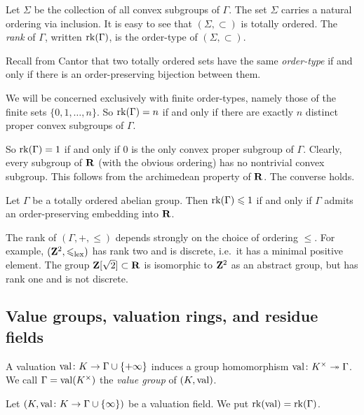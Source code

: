 Let $\Sigma$ be the collection of all convex subgroups of $\Gamma$. The set 
$\Sigma$ carries a natural ordering via inclusion. It is easy to see that 
$(\Sigma,\subset)$ is totally ordered. The \emph{rank} of $\Gamma$, written 
$\operatorname{rk}(\Gamma)$, is the order-type of $(\Sigma,\subset)$. 

Recall from Cantor that two totally ordered sets have the same 
\emph{order-type} if and only if there is an order-preserving bijection between 
them. 

We will be concerned exclusively with finite order-types, namely those of 
the finite sets $\{0,1,\dots,n\}$. So $\operatorname{rk}(\Gamma)=n$ if and only if there 
are exactly $n$ distinct proper convex subgroups of $\Gamma$. 

So $\operatorname{rk}(\Gamma)=1$ if and only if $0$ is the only convex proper subgroup of 
$\Gamma$. Clearly, every subgroup of $\mathbf{R}$ (with the obvious ordering) has no 
nontrivial convex subgroup. This follows from the archimedean property of 
$\mathbf{R}$. The converse holds. 

\begin{theorem}
Let $\Gamma$ be a totally ordered abelian group. Then
$\operatorname{rk}(\Gamma)\leqslant 1$ if and only if $\Gamma$ admits an order-preserving 
embedding into $\mathbf{R}$. 
\end{theorem}

The rank of $(\Gamma,+,\leqslant)$ depends strongly on the choice of ordering 
$\leqslant$. For example, $(\mathbf{Z}^2,\leqslant_\mathrm{lex})$ has rank two and is 
discrete, i.e.~it has a minimal positive element. The group 
$\mathbf{Z}[\sqrt{2}]\subset \mathbf{R}$ is isomorphic to $\mathbf{Z}^2$ as an abstract group, but 
has rank one and is not discrete. 





\subsection{Value groups, valuation rings, and residue fields}

A valuation $\operatorname{val}\colon K\to \Gamma\cup\{+\infty\}$ induces a group 
homomorphism $\operatorname{val}\colon K^\times \twoheadrightarrow \Gamma$. We call 
$\Gamma=\operatorname{val}(K^\times)$ the \emph{value group} of $(K,\operatorname{val})$. 

\begin{definition}
Let $(K,\operatorname{val}\colon K\to \Gamma\cup\{\infty\})$ be a valuation field. We 
put $\operatorname{rk}(\operatorname{val})=\operatorname{rk}(\Gamma)$. 
\end{definition}

